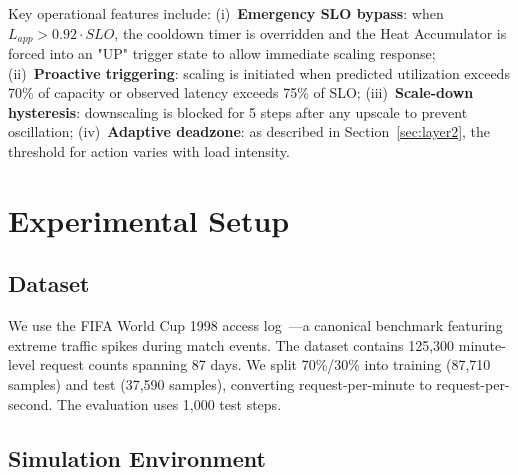 \documentclass[conference]{IEEEtran}
\begin{document}
Key operational features include: (i)~\textbf{Emergency SLO bypass}: when $L_{app} > 0.92 \cdot SLO$, the cooldown timer is overridden and the Heat Accumulator is forced into an "UP" trigger state to allow immediate scaling response; (ii)~\textbf{Proactive triggering}: scaling is initiated when predicted utilization exceeds 70\% of capacity or observed latency exceeds 75\% of SLO; (iii)~\textbf{Scale-down hysteresis}: downscaling is blocked for 5 steps after any upscale to prevent oscillation; (iv)~\textbf{Adaptive deadzone}: as described in Section~\ref{sec:layer2}, the threshold for action varies with load intensity.

\section{Experimental Setup}
\label{sec:setup}

\subsection{Dataset}

We use the FIFA World Cup 1998 access log~\cite{guruge2025time}---a canonical benchmark featuring extreme traffic spikes during match events. The dataset contains 125,300 minute-level request counts spanning 87 days. We split 70\%/30\% into training (87,710 samples) and test (37,590 samples), converting request-per-minute to request-per-second. The evaluation uses 1,000 test steps.

\subsection{Simulation Environment}
\end{document}

